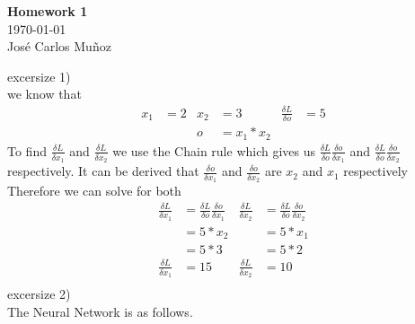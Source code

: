 \documentclass[12pt,english]{article}
\begin{document}
\begin{center}
    \Large
    \textbf{Homework 1}\\
    \small
    \today\\
    \large
    Jos\'{e} Carlos Mu\~{n}oz
\end{center}
excersize 1)\\
we know that
\begin{align*}
x_1&=2 & x_2&= 3 & \frac{\delta L}{\delta o}&=5\\
     &     & o   &= x_1 * x_2 
\end{align*}
To find $\frac{\delta L}{\delta x_1}$ and $\frac{\delta L}{\delta x_2}$ we use the Chain rule which gives us $\frac{\delta L}{\delta o}\frac{\delta o}{\delta x_1}$ and $\frac{\delta L}{\delta o}\frac{\delta o}{\delta x_2}$ respectively. It can be derived that $\frac{\delta o}{\delta x_1}$ and $\frac{\delta o}{\delta x_2}$ are $x_2$ and $x_1$ respectively\\
Therefore we can solve for both\\
\begin{align*}
\frac{\delta L}{\delta x_1}&=\frac{\delta L}{\delta o}\frac{\delta o}{\delta x_1} & \frac{\delta L}{\delta x_2}&=\frac{\delta L}{\delta o}\frac{\delta o}{\delta x_2}\\
                                      &=5*x_2  &  &=5 *x_1\\
                                      &=5*3  &  &=5 *2\\
\frac{\delta L}{\delta x_1}&=15  &  \frac{\delta L}{\delta x_2}&=10\\
\end{align*}
excersize 2)\\
The Neural Network is as follows.
\newcommand{\inputnum}{2}  
\newcommand{\hiddennum}{2}   
\newcommand{\outputnum}{1}  
\end{document}
